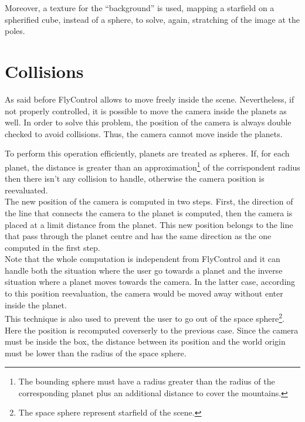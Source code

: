 \documentclass[paper=a4, fontsize=11pt]{scrartcl} %
\numberwithin{equation}{section} %
\numberwithin{figure}{section} %
\numberwithin{table}{section} %
\theoremstyle{definition}
\begin{document}
Moreover, a texture for the ``background'' is used, mapping a starfield on a
spherified cube, instead of a sphere, to solve, again, stratching of the image at the poles.


\section{Collisions}

As said before FlyControl allows to move freely inside the scene.
Nevertheless, if not properly controlled, it is possible to move the camera
inside the planets as well.
In order to solve this problem, the position of the camera is always double
checked to avoid collisions. Thus, the camera cannot move inside the planets.

To perform this operation efficiently, planets are treated as spheres. If,
for each planet, the distance is greater than an approximation\footnote{The bounding sphere must have a radius greater than the radius of the corresponding planet plus an additional distance to cover the mountains.} of the corrispondent radius then there isn't any collision to handle, otherwise the camera position is reevaluated.\\
The new position of the camera is computed in two steps. First, the direction of the line that connects the camera to the planet is computed, then the camera is placed at a limit distance from the planet. This new position belongs to the line that pass through the planet centre and has the same direction as the one computed in the first step.\\
Note that the whole computation is independent from FlyControl and it can handle both the situation where the user go towards a planet and the inverse situation where a planet moves towards the camera. In the latter case, according to this position reevaluation, the camera would be moved away without enter inside 
the planet.\\
This technique is also used to prevent the user to go out of the space sphere\footnote{The space sphere represent starfield of the scene.}. Here the
position is recomputed coverserly to the previous case. Since the camera must be inside the box, the distance between its position and the world origin must be lower than the radius of the space sphere.

\end{document}
